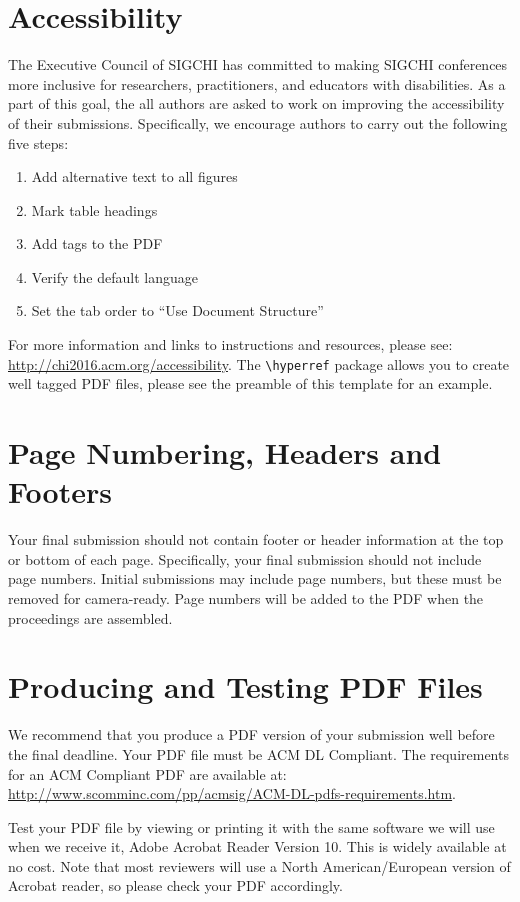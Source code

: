 \documentclass{ciis}
\begin{document}
\section{Accessibility}
The Executive Council of SIGCHI has committed to making SIGCHI
conferences more inclusive for researchers, practitioners, and
educators with disabilities. As a part of this goal, the all authors
are asked to work on improving the accessibility of their
submissions. Specifically, we encourage authors to carry out the
following five steps:
\begin{enumerate}
\item Add alternative text to all figures
\item Mark table headings
\item Add tags to the PDF
\item Verify the default language
\item Set the tab order to ``Use Document Structure''
\end{enumerate}
For more information and links to instructions and resources, please
see: \url{http://chi2016.acm.org/accessibility}.  The
\texttt{{\textbackslash}hyperref} package allows you to create well tagged PDF files,
please see the preamble of this template for an example.

\section{Page Numbering, Headers and Footers}
Your final submission should not contain footer or header information
at the top or bottom of each page. Specifically, your final submission
should not include page numbers. Initial submissions may include page
numbers, but these must be removed for camera-ready. Page numbers will
be added to the PDF when the proceedings are assembled.

\section{Producing and Testing PDF Files}

We recommend that you produce a PDF version of your submission well
before the final deadline.  Your PDF file must be ACM DL
Compliant. The requirements for an ACM Compliant PDF are available at:
{\url{http://www.scomminc.com/pp/acmsig/ACM-DL-pdfs-requirements.htm}}.

Test your PDF file by viewing or printing it with the same software we
will use when we receive it, Adobe Acrobat Reader Version 10. This is
widely available at no cost. Note that most
reviewers will use a North American/European version of Acrobat
reader, so please check your PDF accordingly.
\end{document}
